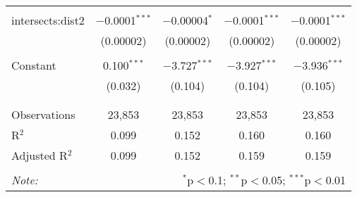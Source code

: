 \begin{table}[!htbp]
\begin{tabular}{@{\extracolsep{-5pt}}lcccc}
  & & & & \\ 
 intersects:dist2 & $-$0.0001$^{***}$ & $-$0.00004$^{*}$ & $-$0.0001$^{***}$ & $-$0.0001$^{***}$ \\ 
  & (0.00002) & (0.00002) & (0.00002) & (0.00002) \\ 
  & & & & \\ 
 Constant & 0.100$^{***}$ & $-$3.727$^{***}$ & $-$3.927$^{***}$ & $-$3.936$^{***}$ \\ 
  & (0.032) & (0.104) & (0.104) & (0.105) \\ 
  & & & & \\ 
\hline \\[-1.8ex] 
Observations & 23,853 & 23,853 & 23,853 & 23,853 \\ 
R$^{2}$ & 0.099 & 0.152 & 0.160 & 0.160 \\ 
Adjusted R$^{2}$ & 0.099 & 0.152 & 0.159 & 0.159 \\ 
\hline 
\hline \\[-1.8ex] 
\textit{Note:}  & \multicolumn{4}{r}{$^{*}$p$<$0.1; $^{**}$p$<$0.05; $^{***}$p$<$0.01} \\ 
\end{tabular} 
\end{table} 
